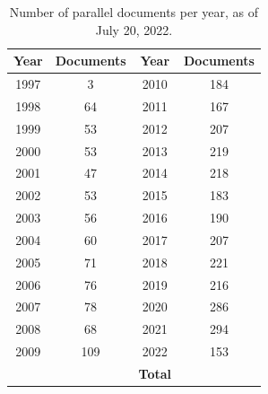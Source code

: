 \begin{table}
\centering
\begin{tabular}{cc|cc}
\toprule
Year & Documents & Year & Documents\\
\midrule
1997 &	3 & 2010	&184\\
1998 & 64 & 2011	&167\\
1999 & 53 & 2012&	207 \\
2000 & 53 & 2013 &	219 \\
2001 &	47 &2014	&218\\
2002 & 53 &2015	&183 \\
2003 &	56 & 2016	&190\\
2004&	60 & 2017	&207\\
2005	&71 & 2018	&221 \\
2006	&76 & 2019	&216 \\
2007	&78 & 2020	&286 \\
2008	&68 & 2021	&294 \\
2009	&109&2022	&153\\
		
		\midrule
		&   & \textbf{Total} & \textbf{\numprint{3536}} \\
\bottomrule
\end{tabular}
\caption[Number of parallel documents per year]{Number of parallel documents per year, as of July 20, 2022.}
\label{tab:docs-per-year}
\end{table}

